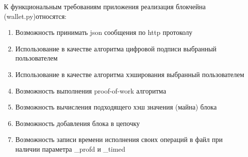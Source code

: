 К функциональным требованиям приложения реализация блокчейна ({\small wallet.py})относятся:
\begin{enumerate}
    \item Возможность принимать json сообщения по http протоколу
    \item Использование в качестве алгоритма цифровой подписи выбранный пользователем
    \item Использование в качестве алгоритма хэширования выбранный пользователем
    \item Возможность выполнения proof-of-work алгоритма
    \item Возможность вычисления подходящего хэш значения (майна) блока
    \item Возможность добавления блока в цепочку
    \item Возможность записи времени исполнения своих операций в файл при
          наличии параметра \_profd и \_timed
\end{enumerate}
